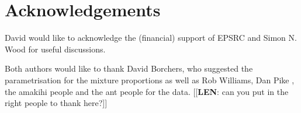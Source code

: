 \documentclass[useAMS,referee, usegraphicx]{biom}
\begin{document}

\backmatter


\section*{Acknowledgements}

David would like to acknowledge the (financial) support of EPSRC and Simon N. Wood for useful discussions.

Both authors would like to thank David Borchers, who suggested the parametrisation for the mixture proportions as well as Rob Williams, Dan Pike , the amakihi people and the ant people for the data. [[\textbf{LEN}: can you put in the right people to thank here?]]



\end{document}
